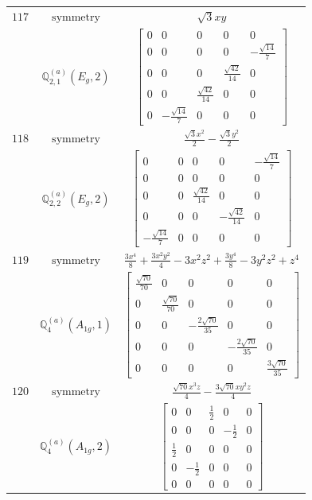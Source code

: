 \documentclass[fleqn,8pt,landscape]{jsarticle}
\begin{document}
\begin{longtable}{ccc}
$ 117 $ & $ \text{symmetry} $ & $ \sqrt{3} x y $ \\
$  $ & $ \mathbb{Q}_{2,1}^{(a)}(E_{g},2) $ & $ \begin{bmatrix} 0 & 0 & 0 & 0 & 0 \\ 0 & 0 & 0 & 0 & - \frac{\sqrt{14}}{7} \\ 0 & 0 & 0 & \frac{\sqrt{42}}{14} & 0 \\ 0 & 0 & \frac{\sqrt{42}}{14} & 0 & 0 \\ 0 & - \frac{\sqrt{14}}{7} & 0 & 0 & 0 \end{bmatrix} $ \\ \hline
$ 118 $ & $ \text{symmetry} $ & $ \frac{\sqrt{3} x^{2}}{2} - \frac{\sqrt{3} y^{2}}{2} $ \\
$  $ & $ \mathbb{Q}_{2,2}^{(a)}(E_{g},2) $ & $ \begin{bmatrix} 0 & 0 & 0 & 0 & - \frac{\sqrt{14}}{7} \\ 0 & 0 & 0 & 0 & 0 \\ 0 & 0 & \frac{\sqrt{42}}{14} & 0 & 0 \\ 0 & 0 & 0 & - \frac{\sqrt{42}}{14} & 0 \\ - \frac{\sqrt{14}}{7} & 0 & 0 & 0 & 0 \end{bmatrix} $ \\ \hline
$ 119 $ & $ \text{symmetry} $ & $ \frac{3 x^{4}}{8} + \frac{3 x^{2} y^{2}}{4} - 3 x^{2} z^{2} + \frac{3 y^{4}}{8} - 3 y^{2} z^{2} + z^{4} $ \\
$  $ & $ \mathbb{Q}_{4}^{(a)}(A_{1g},1) $ & $ \begin{bmatrix} \frac{\sqrt{70}}{70} & 0 & 0 & 0 & 0 \\ 0 & \frac{\sqrt{70}}{70} & 0 & 0 & 0 \\ 0 & 0 & - \frac{2 \sqrt{70}}{35} & 0 & 0 \\ 0 & 0 & 0 & - \frac{2 \sqrt{70}}{35} & 0 \\ 0 & 0 & 0 & 0 & \frac{3 \sqrt{70}}{35} \end{bmatrix} $ \\ \hline
$ 120 $ & $ \text{symmetry} $ & $ \frac{\sqrt{70} x^{3} z}{4} - \frac{3 \sqrt{70} x y^{2} z}{4} $ \\
$  $ & $ \mathbb{Q}_{4}^{(a)}(A_{1g},2) $ & $ \begin{bmatrix} 0 & 0 & \frac{1}{2} & 0 & 0 \\ 0 & 0 & 0 & - \frac{1}{2} & 0 \\ \frac{1}{2} & 0 & 0 & 0 & 0 \\ 0 & - \frac{1}{2} & 0 & 0 & 0 \\ 0 & 0 & 0 & 0 & 0 \end{bmatrix} $ \\ \hline

\end{longtable}
\end{document}
